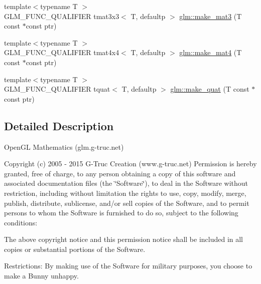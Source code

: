 \begin{DoxyCompactItemize}
\item 
{\footnotesize template$<$typename T $>$ }\\G\+L\+M\+\_\+\+F\+U\+N\+C\+\_\+\+Q\+U\+A\+L\+I\+F\+I\+E\+R tmat3x3$<$ T, defaultp $>$ \hyperlink{group__gtc__type__ptr_gac2bc10c519ffc8db9e24f325f23787ea}{glm\+::make\+\_\+mat3} (T const $\ast$const ptr)
\item 
{\footnotesize template$<$typename T $>$ }\\G\+L\+M\+\_\+\+F\+U\+N\+C\+\_\+\+Q\+U\+A\+L\+I\+F\+I\+E\+R tmat4x4$<$ T, defaultp $>$ \hyperlink{group__gtc__type__ptr_ga2c6e6d457cb932e1ce683e4f690a6f60}{glm\+::make\+\_\+mat4} (T const $\ast$const ptr)
\item 
{\footnotesize template$<$typename T $>$ }\\G\+L\+M\+\_\+\+F\+U\+N\+C\+\_\+\+Q\+U\+A\+L\+I\+F\+I\+E\+R tquat$<$ T, defaultp $>$ \hyperlink{group__gtc__type__ptr_gaadafb6600af2633e4c98cc64c72f5269}{glm\+::make\+\_\+quat} (T const $\ast$const ptr)
\end{DoxyCompactItemize}


\subsection{Detailed Description}
Open\+G\+L Mathematics (glm.\+g-\/truc.\+net)

Copyright (c) 2005 -\/ 2015 G-\/\+Truc Creation (www.\+g-\/truc.\+net) Permission is hereby granted, free of charge, to any person obtaining a copy of this software and associated documentation files (the \char`\"{}\+Software\char`\"{}), to deal in the Software without restriction, including without limitation the rights to use, copy, modify, merge, publish, distribute, sublicense, and/or sell copies of the Software, and to permit persons to whom the Software is furnished to do so, subject to the following conditions\+:

The above copyright notice and this permission notice shall be included in all copies or substantial portions of the Software.

Restrictions\+: By making use of the Software for military purposes, you choose to make a Bunny unhappy.

